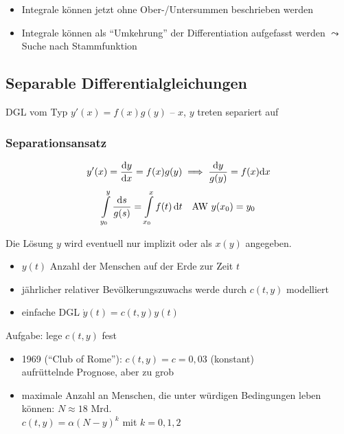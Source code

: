 \begin{note}
  \begin{itemize}
    \item Integrale können jetzt ohne Ober-/Untersummen beschrieben werden
    \item Integrale können als "`Umkehrung"' der Differentiation aufgefasst werden $\leadsto$ Suche nach Stammfunktion
  \end{itemize}
\end{note}

\subsection{Separable Differentialgleichungen}

DGL vom Typ $y'(x) = f(x)g(y)$ -- $x$, $y$ treten separiert auf

\subsubsection*{Separationsansatz}

\[ y'(x) = \frac{\mathrm d y}{\mathrm d x} = f(x) g(y) \implies \frac{\mathrm d y}{g(y)} = f(x)\mathrm d x\]
\[ \int\limits_{y_0}^y \frac{\mathrm d s}{g(s)} = \int\limits_{x_0}^{x} f(t)\,\mathrm d t \quad\text{AW } y(x_0) = y_0 \]

\begin{note}
  Die Lösung $y$ wird eventuell nur implizit oder als $x(y)$ angegeben.
\end{note}

\begin{example}
  \begin{itemize}
    \item $y(t)$ Anzahl der Menschen auf der Erde zur Zeit $t$
    \item jährlicher relativer Bevölkerungszuwachs werde durch $c(t,y)$ modelliert
    \item einfache DGL $\dot y(t) = c(t,y)y(t)$
  \end{itemize}
  Aufgabe: lege $c(t,y)$ fest
  \begin{itemize}
    \item 1969 ("`Club of Rome"'): $c(t,y) = c = 0,03$ (konstant)\\
      aufrüttelnde Prognose, aber zu grob
    \item maximale Anzahl an Menschen, die unter würdigen Bedingungen leben können: $N \approx 18 \text{ Mrd.}$\\
      $c(t,y) = \alpha (N-y)^k$ mit $k = 0, 1, 2$
  \end{itemize}

\end{example}

